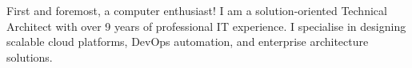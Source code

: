 \documentclass[9pt]{style/developercv}
\begin{document}
\vspace{0.5cm}



\begin{minipage}[t]{0.4\textwidth} %
	\vspace{-\baselineskip} %

  First and foremost, a computer enthusiast! I am a solution-oriented Technical Architect with over 9 years of professional IT experience.
  I specialise in designing scalable cloud platforms, DevOps automation, and enterprise architecture solutions.

\end{minipage}
\hfill %
\begin{minipage}[t]{0.5\textwidth} %
	\vspace{-\baselineskip} %
  \begin{barchart}{5.5}
	\end{barchart}
\end{minipage}

\vspace{1cm}

\end{document}
